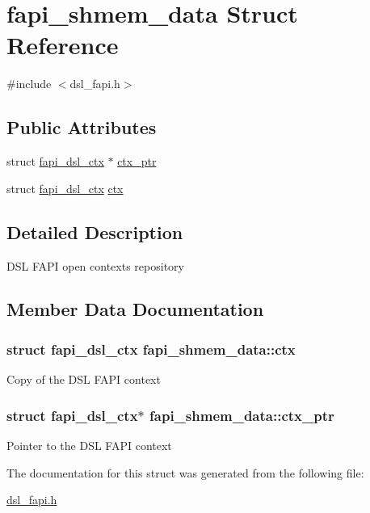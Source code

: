 \hypertarget{structfapi__shmem__data}{\section{fapi\-\_\-shmem\-\_\-data Struct Reference}
\label{structfapi__shmem__data}
}


{\ttfamily \#include $<$dsl\-\_\-fapi.\-h$>$}

\subsection*{Public Attributes}
\begin{DoxyCompactItemize}
\item 
struct \hyperlink{structfapi__dsl__ctx}{fapi\-\_\-dsl\-\_\-ctx} $\ast$ \hyperlink{structfapi__shmem__data_a9d6a8b88fc6bbef5e2d9a24b4c03f9a8}{ctx\-\_\-ptr}
\item 
struct \hyperlink{structfapi__dsl__ctx}{fapi\-\_\-dsl\-\_\-ctx} \hyperlink{structfapi__shmem__data_aea5330eb6ae8e84e9d1c300b8e779c24}{ctx}
\end{DoxyCompactItemize}


\subsection{Detailed Description}
D\-S\-L F\-A\-P\-I open contexts repository 

\subsection{Member Data Documentation}
\hypertarget{structfapi__shmem__data_aea5330eb6ae8e84e9d1c300b8e779c24}{
\subsubsection[{ctx}]{\setlength{\rightskip}{0pt plus 5cm}struct {\bf fapi\-\_\-dsl\-\_\-ctx} fapi\-\_\-shmem\-\_\-data\-::ctx}}\label{structfapi__shmem__data_aea5330eb6ae8e84e9d1c300b8e779c24}
Copy of the D\-S\-L F\-A\-P\-I context \hypertarget{structfapi__shmem__data_a9d6a8b88fc6bbef5e2d9a24b4c03f9a8}{
\subsubsection[{ctx\-\_\-ptr}]{\setlength{\rightskip}{0pt plus 5cm}struct {\bf fapi\-\_\-dsl\-\_\-ctx}$\ast$ fapi\-\_\-shmem\-\_\-data\-::ctx\-\_\-ptr}}\label{structfapi__shmem__data_a9d6a8b88fc6bbef5e2d9a24b4c03f9a8}
Pointer to the D\-S\-L F\-A\-P\-I context 

The documentation for this struct was generated from the following file\-:\begin{DoxyCompactItemize}
\item 
\hyperlink{dsl__fapi_8h}{dsl\-\_\-fapi.\-h}\end{DoxyCompactItemize}

